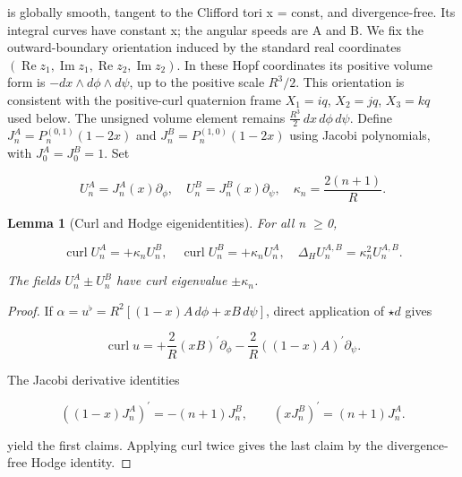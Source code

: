 \documentclass[10pt,letterpaper]{article}
\newtheorem{lemma}[theorem]{Lemma}
\theoremstyle{remark}
\begin{document}
is globally smooth, tangent to the Clifford tori x = const, and divergence-free. Its integral curves have constant x; the angular speeds are A and B. We fix the outward-boundary orientation induced by the standard real coordinates $(\operatorname{Re}z_1,\operatorname{Im}z_1,\operatorname{Re}z_2,\operatorname{Im}z_2)$. In these Hopf coordinates its positive volume form is $-dx\wedge d\phi\wedge d\psi$, up to the positive scale \(R^3/2\). This orientation is consistent with the positive-curl quaternion frame $X_1=iq$, $X_2=jq$, $X_3=kq$ used below. The unsigned volume element remains $\frac{R^3}{2}\,dx\,d\phi\,d\psi$. Define $J_n^A=P_n^{(0,1)}(1-2x)$ and $J_n^B=P_n^{(1,0)}(1-2x)$ using Jacobi polynomials, with $J_0^A=J_0^B=1$. Set



\begin{equation}
\tag{6}\label{eq:6}
U_n^A=J_n^A(x)\partial_\phi,\quad U_n^B=J_n^B(x)\partial_\psi,\quad\kappa_n=\frac{2(n+1)}R.
\end{equation}

\begin{lemma}[Curl and Hodge eigenidentities]

For all n \(\ge \)0,


\begin{equation}
\tag{7}\label{eq:7}
\operatorname{curl}U_n^A=+\kappa_n U_n^B,\quad\operatorname{curl}U_n^B=+\kappa_n U_n^A,\quad\Delta_HU_n^{A,B}=\kappa_n^2 U_n^{A,B}.
\end{equation}

The fields $U_n^A\pm U_n^B$ have curl eigenvalue $\pm\kappa_n$.


\end{lemma}

\begin{proof}
If $\alpha=u^\flat=R^2[(1-x)A\,d\phi+xB\,d\psi]$, direct application of $\star d$ gives


\begin{equation}
\tag{8}\label{eq:8}
\operatorname{curl}u=+\frac2R(xB)^\prime\partial_\phi-\frac2R((1-x)A)^\prime\partial_\psi.
\end{equation}

The Jacobi derivative identities



\begin{equation}
\tag{9}\label{eq:9}
((1-x)J_n^A)^\prime=-(n+1)J_n^B,\qquad (xJ_n^B)^\prime=(n+1)J_n^A.
\end{equation}

yield the first claims. Applying curl twice gives the last claim by the divergence-free Hodge identity.


\end{proof}
\end{document}
